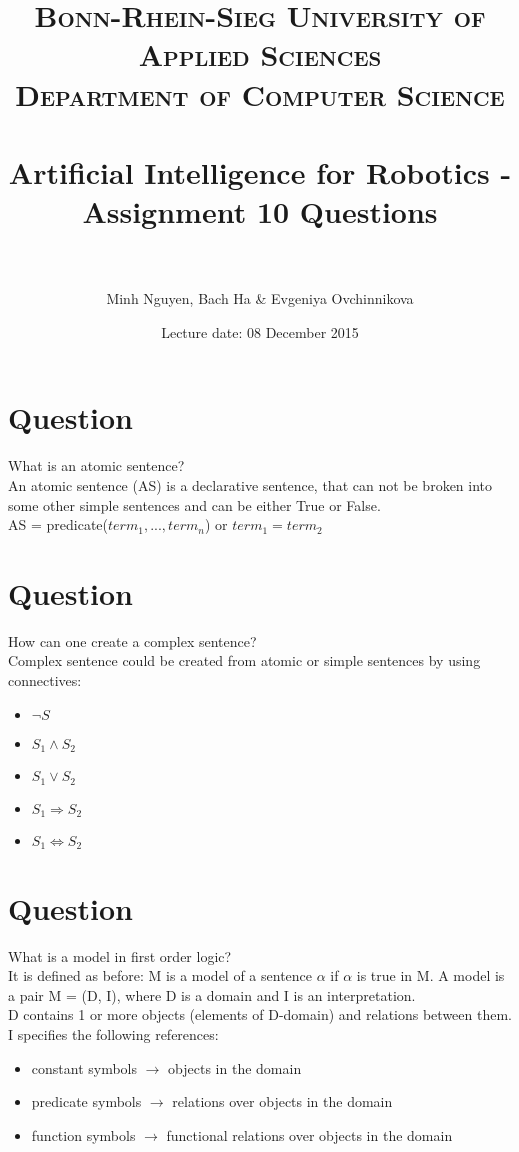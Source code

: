 \documentclass[paper=a4, fontsize=11pt]{scrartcl} %
\title{	
\normalfont \normalsize 
\textsc{Bonn-Rhein-Sieg University of Applied Sciences \\Department of Computer Science} \\ [10pt] %
\horrule{0.5pt} \\[0.4cm] %
\LARGE Artificial Intelligence for Robotics - Assignment 10 Questions \\ %
\horrule{2pt} \\[0.5cm] %
}
\author{Minh Nguyen, Bach Ha \& Evgeniya Ovchinnikova} %
\date{Lecture date: 08 December 2015}
\begin{document}
\maketitle %


\section{Question}

What is an atomic sentence?\\

An atomic sentence (AS) is a declarative sentence, that can not be broken into some other simple sentences and can be either True or False.\\

AS = predicate($term_1 , . . . , term_n$) or $term_1 = term_2$


\section{Question}

How can one create a complex sentence?\\

Complex sentence could be created from atomic or simple sentences by using connectives:

\begin{itemize}
\item $	\neg S$
\item $	S_1 \wedge S_2$
\item $S_1 \vee S_2$
\item $S_1 \Rightarrow S_2$
\item $S_1 \Leftrightarrow S_2$
\end{itemize}


\section{Question}

What is a model in first order logic?\\

It is defined as before: M is a model of a sentence $\alpha$ if $\alpha$ is true in M.
A model is a pair M = (D, I), where D is a domain and I is an interpretation. \\

D contains 1 or more objects (elements of D-domain) and relations between them.\\
I specifies the following references:
\begin{itemize}
\item constant symbols $	\rightarrow$ objects in the domain
\item predicate symbols $	\rightarrow$ relations over objects in the domain
\item function symbols $	\rightarrow$ functional relations over objects in the domain
\end{itemize}
\end{document}
